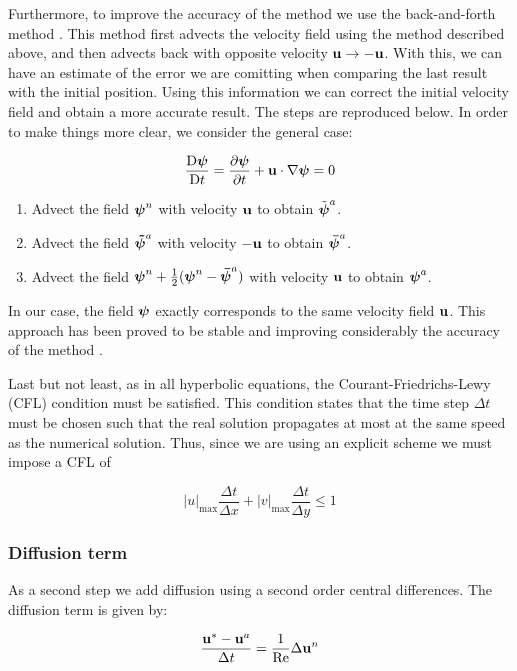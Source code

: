Furthermore, to improve the accuracy of the method we use the back-and-forth method \cite{backforth}. This method first advects the velocity field using the method described above, and then advects back with opposite velocity $\boldsymbol{\mathrm{u}}\to -\boldsymbol{\mathrm{u}}$. With this, we can have an estimate of the error we are comitting when comparing the last result with the initial position. Using this information we can correct the initial velocity field and obtain a more accurate result. The steps are reproduced below. In order to make things more clear, we consider the general case:

\begin{equation*}
  \frac{\mathrm{D}\boldsymbol{\mathrm{\psi}}}{\mathrm{D}t} = \pdv{\boldsymbol{\mathrm{\psi}}}{t} + \boldsymbol{\mathrm{u}} \cdot \nabla \boldsymbol{\mathrm{\psi}} = 0
\end{equation*}

\begin{enumerate}
  \item Advect the field $\boldsymbol{\mathrm{\psi}}^n$ with velocity $\boldsymbol{\mathrm{u}}$ to obtain $\tilde{\boldsymbol{\mathrm{\psi}}}^a$.
  \item Advect the field $\boldsymbol{\mathrm{\tilde{\psi}}}^a$ with velocity $-\boldsymbol{\mathrm{u}}$ to obtain $\boldsymbol{\mathrm{\bar{\psi}}}^a$.
  \item Advect the field $\boldsymbol{\mathrm{\psi}}^n + \frac{1}{2} (\boldsymbol{\mathrm{{\psi}}}^n - \boldsymbol{\mathrm{\bar{\psi}}}^a)$ with velocity $\boldsymbol{\mathrm{u}}$ to obtain $\boldsymbol{\mathrm{\psi}}^a$.
\end{enumerate}

In our case, the field $\boldsymbol{\mathrm{\psi}}$ exactly corresponds to the same velocity field $\boldsymbol{\mathrm{u}}$. This approach has been proved to be stable and improving considerably the accuracy of the method \cite{backforth}. 

Last but not least, as in all hyperbolic equations, the Courant-Friedrichs-Lewy (CFL) condition must be satisfied. This condition states that the time step $\Delta t$ must be chosen such that the real solution propagates at most at the same speed as the numerical solution. Thus, since we are using an explicit scheme we must impose a CFL of

$$|u|_{\text{max}} \frac{\Delta t}{\Delta x} +|v|_{\text{max}} \frac{\Delta t}{\Delta y}\leq 1$$

\subsubsection*{Diffusion term}
As a second step we add diffusion using a second order central differences. The diffusion term is given by:

\begin{equation*}
  \frac{\boldsymbol{\mathrm{u}}^* - \boldsymbol{\mathrm{u}}^a}{\Delta t} = \frac{1}{\mathrm{Re}} \Delta \boldsymbol{\mathrm{u}}^n
\end{equation*}

